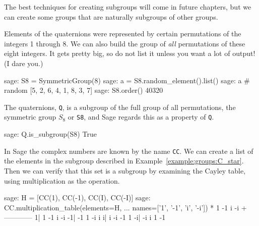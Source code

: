 %
The best techniques for creating subgroups will come in future chapters, but we can create some groups that are naturally subgroups of other groups.\par
%
Elements of the quaternions were represented by certain permutations of the integers 1 through 8.  We can also build the group of \emph{all} permutations of these eight integers.  It gets pretty big, so do not list it unless you want a lot of output!  (I dare you.)
%
\begin{sageexample}
sage: S8 = SymmetricGroup(8)
sage: a = S8.random_element().list()
sage: a                     # random
[5, 2, 6, 4, 1, 8, 3, 7]
sage: S8.order()
40320
\end{sageexample}
%
The quaternions, \verb?Q?, is a subgroup of the full group of all permutations, the symmetric group $S_8$ or \verb?S8?, and Sage regards this as a property of \verb?Q?.
%
\begin{sageexample}
sage: Q.is_subgroup(S8)
True
\end{sageexample}
%
In Sage the complex numbers are known by the name \verb?CC?.  We can create a list of the elements in the subgroup described in Example~\ref{example:groups:C_star}.  Then we can verify that this set is a subgroup by examining the Cayley table, using multiplication as the operation.
%
\begin{sageexample}
sage: H = [CC(1), CC(-1), CC(I), CC(-I)]
sage: CC.multiplication_table(elements=H,
...                           names=['1', '-1', 'i', '-i'])
 *   1 -1  i -i
  +------------
 1|  1 -1  i -i
-1| -1  1 -i  i
 i|  i -i -1  1
-i| -i  i  1 -1
\end{sageexample}
%
\begin{sageverbatim}
\end{sageverbatim}
%











